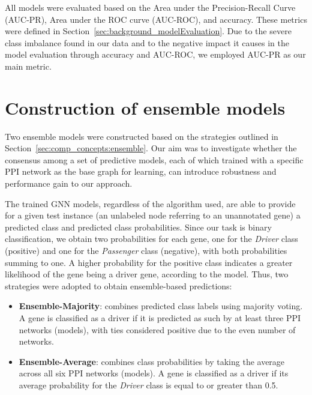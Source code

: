All models were evaluated based on the Area under the Precision-Recall Curve (AUC-PR), Area under the ROC curve (AUC-ROC), and accuracy. These metrics were defined in Section~\ref{sec:background_modelEvaluation}. Due to the severe class imbalance found in our data and to the negative impact it causes in the model evaluation through accuracy and AUC-ROC, we employed AUC-PR as our main metric.








\section{Construction of ensemble models}
\label{sec:ensemble_training}

Two ensemble models were constructed based on the strategies outlined in Section~\ref{sec:comp_concepts:ensemble}. Our aim was to investigate whether the consensus among a set of predictive models, each of which trained with a specific PPI network as the base graph for learning, can introduce robustness and performance gain to our approach. 

The trained GNN models, regardless of the algorithm used, are able to provide for a given test instance (\ie an unlabeled node referring to an unannotated gene) a predicted class and predicted class probabilities. Since our task is binary classification, we obtain two probabilities for each gene, one for the \textit{Driver} class (positive) and one for the \textit{Passenger} class (negative), with both probabilities summing to one. A higher probability for the positive class indicates a greater likelihood of the gene being a driver gene, according to the model. Thus, two strategies were adopted to obtain ensemble-based predictions:
\begin{itemize}
    \item \textbf{Ensemble-Majority}: combines predicted class labels using majority voting. A gene is classified as a driver if it is predicted as such by at least three PPI networks (\ie models), with ties considered positive due to the even number of networks.
    \item \textbf{Ensemble-Average}: combines class probabilities by taking the average across all six PPI networks (\ie models). A gene is classified as a driver if its average probability for the \textit{Driver} class is equal to or greater than 0.5.
\end{itemize}

